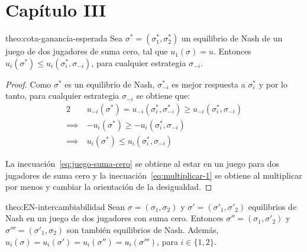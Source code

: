 \section*{Capítulo III}

\begin{reptheorem}{theo:cota-ganancia-esperada}
Sea $\sigma^* = (\sigma^*_1, \sigma^*_2)$ un equilibrio de Nash de un juego de dos jugadores de suma cero, tal que $u_1(\sigma) = u$. Entonces $u_i(\sigma^*) \leq u_i(\sigma^*_i, \sigma_{-i})$, para cualquier estrategia $\sigma_{-i}$.  
\end{reptheorem}

\begin{proof}
Como $\sigma^*$ es un equilibrio de Nash, $\sigma^*_{-i}$ es mejor respuesta a $\sigma^*_i$ y por lo tanto, para cualquier estrategia $\sigma_{-i}$ se obtiene que:
\begin{alignat}{2}
    & u_{-i}(\sigma^*) = u_{-i}(\sigma^*_i, \sigma^*_{-i}) \geq u_{-i}(\sigma^*_i, \sigma_{-i}) \\
    \label{eq:juego-suma-cero}
    \implies\ & -u_i(\sigma^*) \geq -u_i(\sigma^*_i, \sigma_{-i}) \\
    \label{eq:multiplicar-1}
    \implies\ & u_i(\sigma^*) \leq u_i(\sigma^*_i, \sigma_{-i})
\end{alignat}

La inecuación~\ref{eq:juego-suma-cero} se obtiene al estar en un juego para dos jugadores de suma cero y la inecuación~\ref{eq:multiplicar-1} se obtiene al multiplicar por menos y cambiar la orientación de la desigualdad.
\end{proof}

\begin{reptheorem}{theo:EN-intercambiabilidad}
Sean $\sigma = (\sigma_1, \sigma_2)$ y $\sigma' = (\sigma'_1, \sigma'_2)$ equilibrios de Nash en un juego de dos jugadores con suma cero. Entonces $\sigma'' = (\sigma_1, \sigma'_2)$ y $\sigma''' = (\sigma'_1, \sigma_2)$ son también equilibrios de Nash. Además, $u_i(\sigma) = u_i(\sigma') = u_i(\sigma'') = u_i(\sigma''')$, para $i \in \{1, 2\}$.
\end{reptheorem}


